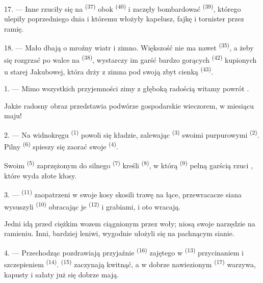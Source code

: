 17. --- Inne rzuciły się na  \textsuperscript{(37)} obok
 \textsuperscript{(40)} i zaczęły bombardować 
\textsuperscript{(39)}, którego ulepiły poprzedniego dnia i któremu włożyły kapelusz,
fajkę i tornister przez ramię.

18. --- Mało dbają o mroźny wiatr i zimno. Większość nie ma nawet 
\textsuperscript{(35)}, a żeby się rozgrzać po walce na 
\textsuperscript{(38)}, wystarczy im garść bardzo gorących 
\textsuperscript{(42)} kupionych u starej  Jakubowej, która drży z
zimna pod swoją zbyt cienką  \textsuperscript{(43)}.

\VUsaut{3.0mm}
\VUsaut{3.0mm}

\VUsaut{4.0mm}

1. --- Mimo wszystkich przyjemności zimy z głęboką radością witamy powrót
.

Jakże radosny obraz przedstawia podwórze gospodarskie wieczorem, w miesiącu maju!

2. --- Na widnokręgu  \textsuperscript{(1)} powoli się kładzie, zalewając
 \textsuperscript{(3)} swoimi purpurowymi 
\textsuperscript{(2)}. Pilny  \textsuperscript{(6)} spieszy się zaorać
swoje  \textsuperscript{(4)}.

Swoim  \textsuperscript{(5)} zaprzężonym do silnego 
\textsuperscript{(7)} kreśli  \textsuperscript{(8)}, w którą
 \textsuperscript{(9)} pełną garścią rzuci , które wyda
złote kłosy.

3. ---  \textsuperscript{(11)} zaopatrzeni w swoje kosy skosili trawę
na łące, przewracacze siana wysuszyli  \textsuperscript{(10)} obracając je
 \textsuperscript{(12)} i grabiami, i oto wracają.

Jedni idą przed ciężkim wozem ciągnionym przez woły; niosą swoje narzędzie na ramieniu.
Inni, bardziej leniwi, wygodnie ułożyli się na pachnącym sianie.

4. --- Przechodząc pozdrawiają przyjaźnie  \textsuperscript{(16)}
zajętego w  \textsuperscript{(13)} przycinaniem 
i szczepieniem  \textsuperscript{(14)}. 
\textsuperscript{(15)} zaczynają kwitnąć, a w dobrze nawiezionym  \textsuperscript{(17)} warzywa, kapusty i sałaty już się dobrze mają.

